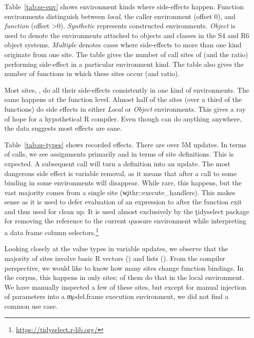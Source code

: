 \documentclass[screen,acmsmall]{acmart}%
\begin{document}
Table~\ref{tab:se-env} shows environment kinds where side-effects happen.
Function environments distinguish between \emph{local}, the caller environment
(offset 0), and \emph{function} (offset >0). \emph{Synthetic} represents
constructed environments. \emph{Object} is used to denote the environments
attached to objects and classes in the S4 and R6 object systems. \emph{Multiple}
denotes cases where side-effects to more than one kind originate from one site.
The table gives the number of call sites of \eval (and the ratio) performing
side-effect in a particular environment kind. The table also gives the number of
functions in which these sites occur (and ratio).

Most sites, \SESitesInOneClass, do all their side-effects consistently in one
kind of environments. The same happens at the function level. Almost half of the
sites (over a third of the functions) do side effects in either \emph{Local} or
\emph{Object} environments. This gives a ray of hope for a hypothetical R
compiler. Even though \eval can do anything anywhere, the data suggests most
effects are sane.

Table~\ref{tab:se-types} shows recorded effects. There are over 5M updates. In
terms of calls, we see assignments primarily and in terms of site definitions.
This is expected. A subsequent \eval call will turn a definition into an update.
The most dangerous side effect is variable removal, as it means that after a
call to \eval some binding in some environments will disappear. While rare, this
happens, but the vast majority comes from a single site
(\c{withr::execute\_handlers}). This makes sense as it is used to defer
evaluation of an expression to after the function exit and thus used for clean
up. It is used almost exclusively by the \c{tidyselect} package for removing the
reference to the current quosure environment while interpreting a data frame
column selectors.\footnote{\cf \url{https://tidyselect.r-lib.org/}}

Looking closely at the value types in variable updates, we observe that the
majority of \eval sites involve basic R vectors (\SEBasicTypeRatio) and lists
(\SEListTypeRatio). From the compiler perspective, we would like to know how
many sites change function bindings. In the corpus, this happens in only
\SEClosureType sites; \SEClosureTypeLocal of them do that in the local
environment. We have manually inspected a few of these sites, but except for
manual injection of parameters into a \c{model.frame} execution environment, we
did not find a common use case.
\end{document}
